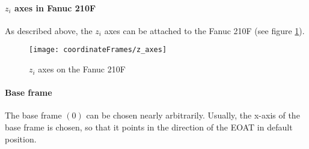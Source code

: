 \paragraph{$z_i$ axes in Fanuc 210F}
As described above, the $z_i$ axes can be attached to the Fanuc 210F (see figure \ref{fig:zi_Axes}).

\begin{figure}[H]
	\texttt{[image: coordinateFrames/z\_axes]}
	\caption{$z_i$ axes on the Fanuc 210F}
	\label{fig:zi_Axes}
\end{figure}

\paragraph{Base frame}

The base frame $(0)$ can be chosen nearly arbitrarily. Usually, the x-axis of the base frame is chosen, so that it points in the direction of the \ac{EOAT} in default position.

